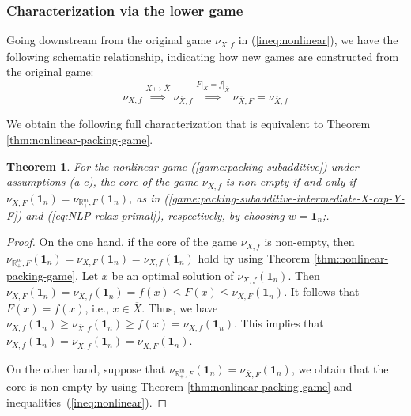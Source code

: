 \documentclass[11pt]{article}\usepackage[]{graphicx}\usepackage[]{xcolor}
\newtheorem{thm}{Theorem}
\begin{document}
\subsubsection{Characterization via the lower game}


Going downstream from the original game $\nu_{X,f}$ in (\ref{ineq:nonlinear}), we have the following schematic relationship, indicating how new games are constructed from the original game:
\[
\nu_{X, f}\overset{X\mapsto \overline{X}}{\implies} \nu_{\overline{X}, f}\overset{F|_{\overline{X}}=f|_{\overline{X}}}{\implies} \nu_{ \overline{X}, F}=\nu_{ \overline{X}, f}
\]

We obtain the following full characterization that is equivalent to Theorem \ref{thm:nonlinear-packing-game}.
\begin{thm} \label{thm:core_nonempty} For the nonlinear game (\ref{game:packing-subadditive}) under assumptions (a-c), the core of the game $\nu_{X, f}$ is non-empty if and only if $\nu_{\overline{X},F}\left(\mathbf{1}_n\right)=\nu_{\mathbb{R}^m_{+},F}\left(\mathbf{1}_n\right)$, as in (\ref{game:packing-subadditive-intermediate-X-cap-Y-F}) and (\ref{eq:NLP-relax-primal}), respectively, by choosing $w=\mathbf{1}_n$;.
\end{thm}
\begin{proof}
On the one hand, if the core of the game $\nu_{X,f}$ is non-empty, then $\nu_{\mathbb{R}^m_{+},F}\left(\mathbf{1}_n\right)=\nu_{X,F}\left(\mathbf{1}_n\right)=\nu_{X,f}\left(\mathbf{1}_n\right)$ hold by using Theorem \ref{thm:nonlinear-packing-game}. Let $x$ be an optimal solution of $\nu_{X,f}\left(\mathbf{1}_n\right)$.
Then $\nu_{X,F}\left(\mathbf{1}_n\right)=\nu_{X,f}\left(\mathbf{1}_n\right)=f(x)\leq F(x)\leq \nu_{X,F}\left(\mathbf{1}_n\right)$.
It follows that $F(x)=f(x)$, i.e., $x\in \overline{X}$.
Thus, we have $\nu_{X,f}\left(\mathbf{1}_n\right)\geq \nu_{\overline{X},f}\left(\mathbf{1}_n\right)\geq f(x)=\nu_{X,f}\left(\mathbf{1}_n\right)$.
This implies that $\nu_{X,f}\left(\mathbf{1}_n\right)=\nu_{\overline{X},f}\left(\mathbf{1}_n\right)=\nu_{\overline{X},F}\left(\mathbf{1}_n\right)$.

On the other hand, suppose that $\nu_{\mathbb{R}^m_{+},F}\left(\mathbf{1}_n\right)=\nu_{\overline{X},F}\left(\mathbf{1}_n\right)$, we obtain that the core is non-empty by using Theorem \ref{thm:nonlinear-packing-game} and inequalities~(\ref{ineq:nonlinear}).
\end{proof}
\end{document}
